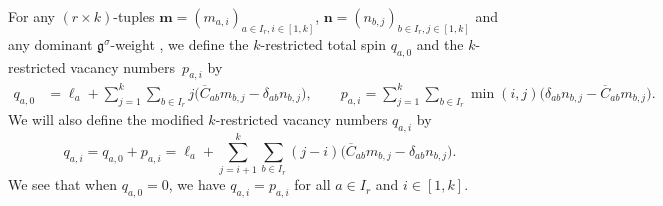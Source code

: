 \documentclass[pdftex]{sigma}
\numberwithin{equation}{section}
\begin{document}
For any $(r\times k)$-tuples $\mathbf{m}=(m_{a,i})_{a\in I_r,i\in[1,k]}$, $\mathbf{n}=(n_{b,j})_{b\in I_r,j\in[1,k]}$ and any dominant $\mathfrak{g}^{\sigma}$-weight , we define the $k$-restricted total spin $q_{a,0}$ and the $k$-restricted vacancy numbers~$p_{a,i}$ by
\begin{align*}
q_{a,0}&=\ell_a+\sum_{j=1}^k\sum_{b\in I_r}j\bigl(\overline{ C}_{ab}m_{b,j}-\delta_{ab}n_{b,j}\bigr),\qquad
p_{a,i}=\sum_{j=1}^k\sum_{b\in I_r}\min(i,j)\bigl(\delta_{ ab}n_{b,j}-\overline{C}_{ab}m_{b,j}\bigr).
\end{align*}
We will also define the modified $k$-restricted vacancy numbers $q_{a,i}$ by
\begin{equation}\label{eq:4.8}
q_{a,i}
=q_{a,0}+p_{a,i}
=\ell_a+\sum_{j=i+1}^k\sum_{b\in I_r}(j-i)\bigl(\overline{C}_{ab}m_{b,j}-\delta_{ab} n_{b,j}\bigr).
\end{equation}
We see that when $q_{a,0}=0$, we have $q_{a,i}=p_{a,i}$ for all $a\in I_r$ and $i\in[1,k]$.
\end{document}
